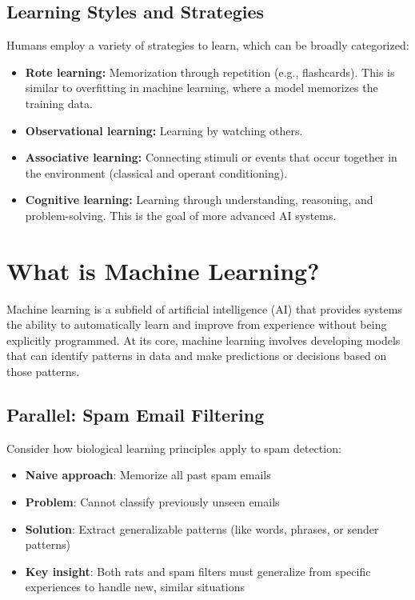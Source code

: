 \subsection{Learning Styles and Strategies}
Humans employ a variety of strategies to learn, which can be broadly categorized:
\begin{itemize}
    \item \textbf{Rote learning:} Memorization through repetition (e.g., flashcards). This is similar to overfitting in machine learning, where a model memorizes the training data.
    \item \textbf{Observational learning:} Learning by watching others.
    \item \textbf{Associative learning:} Connecting stimuli or events that occur together in the environment (classical and operant conditioning).
    \item \textbf{Cognitive learning:} Learning through understanding, reasoning, and problem-solving. This is the goal of more advanced AI systems.
\end{itemize}

\section{What is Machine Learning?}
Machine learning is a subfield of artificial intelligence (AI) that provides systems the ability to automatically learn and improve from experience without being explicitly programmed. At its core, machine learning involves developing models that can identify patterns in data and make predictions or decisions based on those patterns.

\subsection{Parallel: Spam Email Filtering}
Consider how biological learning principles apply to spam detection:
\begin{itemize}
    \item \textbf{Naive approach}: Memorize all past spam emails
    \item \textbf{Problem}: Cannot classify previously unseen emails
    \item \textbf{Solution}: Extract generalizable patterns (like words, phrases, or sender patterns)
    \item \textbf{Key insight}: Both rats and spam filters must generalize from specific experiences to handle new, similar situations
\end{itemize}

